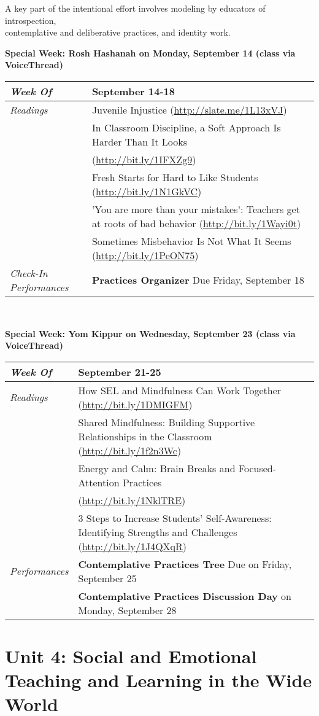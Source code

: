 \documentclass{article}
\newcommand{\gentopic}[1]{\begin{center}\faKey \textsf{#1}\end{center}}
\newcommand{\tabread}{\faBook\medspace\textit{Readings}}
\newcommand{\tabperformance}{\faTasks\medspace\textit{Performances}}
\newcommand{\tabdt}{\faCalendar\medspace\textit{Week Of}}
\newcommand{\tabcheckin}{\faCheckSquareO\medspace\textit{Check-In Performances}}
\newcommand{\tabbreak}{\begin{center}\faAsterisk\faAsterisk\faAsterisk\\\end{center}}
\newcommand{\specialweek}[1]{\begin{center}\textbf{\faBullhorn\medspace Special Week: #1 \medspace\faBullhorn}\end{center}}
\newenvironment{tabsched}
	{\small
	\begin{tabular}{p{1.5in}p{4.5in}}
	\midrule}
	{\midrule
	\end{tabular}
	\normalsize}
\newcommand{\weekfive}{September 14-18}
\newcommand{\weeksix}{September 21-25}
\newcommand{\roshhashanah}{Rosh Hashanah on Monday, September 14 (class via VoiceThread)}
\newcommand{\yomkippur}{Yom Kippur on Wednesday, September 23 (class via VoiceThread)}
\begin{document}
\gentopic{A key part of the intentional effort involves modeling by educators of introspection,\\contemplative and deliberative practices, and identity work.}

\specialweek{\roshhashanah}

\begin{tabsched}
	\tabdt & \weekfive \\
	\midrule
	\tabread & Juvenile Injustice (\url{http://slate.me/1L13xVJ}) \\
	& In Classroom Discipline, a Soft Approach Is Harder Than It Looks \\
	& (\url{http://bit.ly/1IFXZg9}) \\
	& Fresh Starts for Hard to Like Students (\url{http://bit.ly/1N1GkVC}) \\
	& 'You are more than your mistakes': Teachers get at roots of bad behavior (\url{http://bit.ly/1Wayi0t}) \\
	& Sometimes Misbehavior Is Not What It Seems (\url{http://bit.ly/1PeON75}) \\
	\midrule
	\tabcheckin & \textbf{Practices Organizer} Due Friday, September 18 \\
\end{tabsched}

\tabbreak

\newpage

\specialweek{\yomkippur}

\begin{tabsched}
	\tabdt & \weeksix \\
	\midrule
	\tabread & How SEL and Mindfulness Can Work Together (\url{http://bit.ly/1DMIGFM}) \\
	& Shared Mindfulness: Building Supportive Relationships in the Classroom (\url{http://bit.ly/1f2n3Wc}) \\
	& Energy and Calm: Brain Breaks and Focused-Attention Practices \\
	& (\url{http://bit.ly/1NklTRE}) \\
	& 3 Steps to Increase Students' Self-Awareness: Identifying Strengths and Challenges (\url{http://bit.ly/1J4QXqR}) \\
	\midrule
	\tabperformance & \textbf{Contemplative Practices Tree} Due on Friday, September 25 \\
	& \textbf{Contemplative Practices Discussion Day} on Monday, September 28 \\
\end{tabsched}

	\section{Unit 4: Social and Emotional Teaching and Learning in the Wide World}
\end{document}
